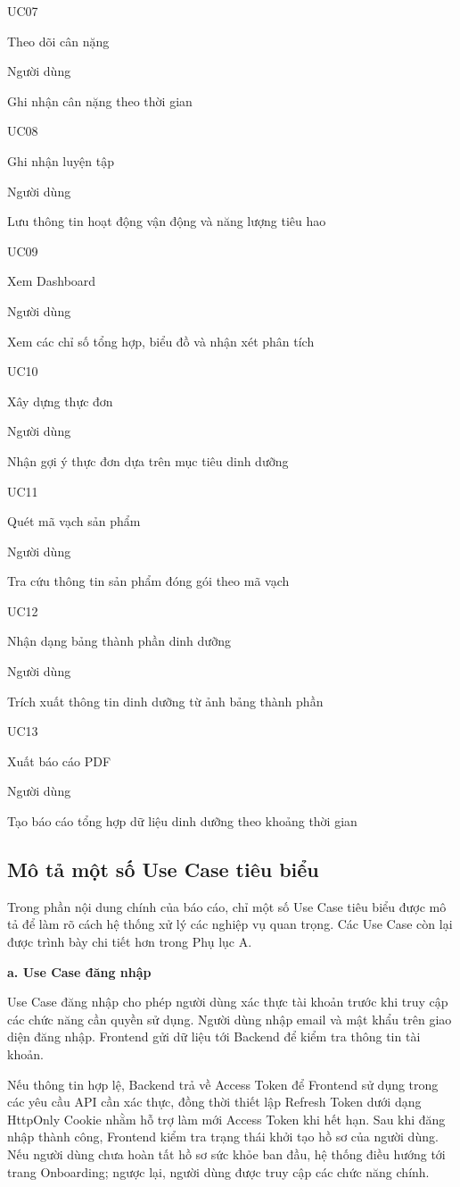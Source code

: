 \documentclass[12pt, a4paper]{report}
\begin{document}
UC07

Theo dõi cân nặng

Người dùng

Ghi nhận cân nặng theo thời gian

UC08

Ghi nhận luyện tập

Người dùng

Lưu thông tin hoạt động vận động và năng lượng tiêu hao

UC09

Xem Dashboard

Người dùng

Xem các chỉ số tổng hợp, biểu đồ và nhận xét phân tích

UC10

Xây dựng thực đơn

Người dùng

Nhận gợi ý thực đơn dựa trên mục tiêu dinh dưỡng

UC11

Quét mã vạch sản phẩm

Người dùng

Tra cứu thông tin sản phẩm đóng gói theo mã vạch

UC12

Nhận dạng bảng thành phần dinh dưỡng

Người dùng

Trích xuất thông tin dinh dưỡng từ ảnh bảng thành phần

UC13

Xuất báo cáo PDF

Người dùng

Tạo báo cáo tổng hợp dữ liệu dinh dưỡng theo khoảng thời gian

\subsection{Mô tả một số Use Case tiêu biểu}Trong phần nội dung chính của báo cáo, chỉ một số Use Case tiêu biểu được mô tả để làm rõ cách hệ thống xử lý các nghiệp vụ quan trọng. Các Use Case còn lại được trình bày chi tiết hơn trong Phụ lục A.

\textbf{a. Use Case đăng nhập}

Use Case đăng nhập cho phép người dùng xác thực tài khoản trước khi truy cập các chức năng cần quyền sử dụng. Người dùng nhập email và mật khẩu trên giao diện đăng nhập. Frontend gửi dữ liệu tới Backend để kiểm tra thông tin tài khoản.

Nếu thông tin hợp lệ, Backend trả về Access Token để Frontend sử dụng trong các yêu cầu API cần xác thực, đồng thời thiết lập Refresh Token dưới dạng HttpOnly Cookie nhằm hỗ trợ làm mới Access Token khi hết hạn. Sau khi đăng nhập thành công, Frontend kiểm tra trạng thái khởi tạo hồ sơ của người dùng. Nếu người dùng chưa hoàn tất hồ sơ sức khỏe ban đầu, hệ thống điều hướng tới trang Onboarding; ngược lại, người dùng được truy cập các chức năng chính.
\end{document}
